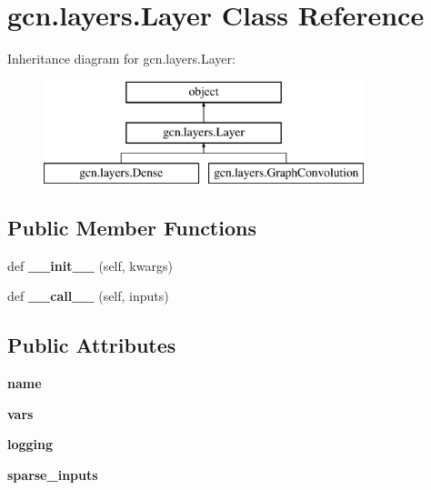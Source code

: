 \hypertarget{classgcn_1_1layers_1_1Layer}{}\section{gcn.\+layers.\+Layer Class Reference}
\label{classgcn_1_1layers_1_1Layer}
Inheritance diagram for gcn.\+layers.\+Layer\+:\begin{figure}[H]
\begin{center}
\leavevmode
\includegraphics[height=3.000000cm]{classgcn_1_1layers_1_1Layer}
\end{center}
\end{figure}
\subsection*{Public Member Functions}
\begin{DoxyCompactItemize}
\item 
\mbox{\label{classgcn_1_1layers_1_1Layer_a3cb75085099246b809c8f1bd2554971a}} 
def {\bfseries \+\_\+\+\_\+init\+\_\+\+\_\+} (self, kwargs)
\item 
\mbox{\label{classgcn_1_1layers_1_1Layer_ac7069f14eebc658a247826ac02a7c73f}} 
def {\bfseries \+\_\+\+\_\+call\+\_\+\+\_\+} (self, inputs)
\end{DoxyCompactItemize}
\subsection*{Public Attributes}
\begin{DoxyCompactItemize}
\item 
\mbox{\label{classgcn_1_1layers_1_1Layer_abc8fd81b46413f4fc7d4b432ec09134c}} 
{\bfseries name}
\item 
\mbox{\label{classgcn_1_1layers_1_1Layer_a42e6cc82997021c3b3353b22c4852cc5}} 
{\bfseries vars}
\item 
\mbox{\label{classgcn_1_1layers_1_1Layer_ac48b4ebad30a7e49877b0f2c466963e8}} 
{\bfseries logging}
\item 
\mbox{\label{classgcn_1_1layers_1_1Layer_ae4b7ee4784d65f356f3fb92c923111db}} 
{\bfseries sparse\+\_\+inputs}
\end{DoxyCompactItemize}


